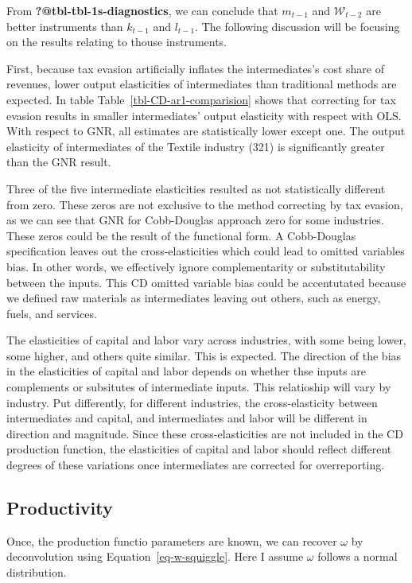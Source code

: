 \documentclass[
  12pt]{article}
\theoremstyle{definition}
\theoremstyle{remark}
\begin{document}
From \textbf{?@tbl-tbl-1s-diagnostics}, we can conclude that \(m_{t-1}\)
and \(\mathcal{W}_{t-2}\) are better instruments than \(k_{t-1}\) and
\(l_{t-1}\). The following discussion will be focusing on the results
relating to thouse instruments.

First, because tax evasion artificially inflates the intermediates's
cost share of revenues, lower output elasticities of intermediates than
traditional methods are expected. In table
Table~\ref{tbl-CD-ar1-comparision} shows that correcting for tax evasion
results in smaller intermediates' output elasticity with respect with
OLS. With respect to GNR, all estimates are statistically lower except
one. The output elasticity of intermediates of the Textile industry
(321) is significantly greater than the GNR result.

Three of the five intermediate elasticities resulted as not
statistically different from zero. These zeros are not exclusive to the
method correcting by tax evasion, as we can see that GNR for
Cobb-Douglas approach zero for some industries. These zeros could be the
result of the functional form. A Cobb-Douglas specification leaves out
the cross-elasticities which could lead to omitted variables bias. In
other words, we effectively ignore complementarity or substitutability
between the inputs. This CD omitted variable bias could be accentutated
because we defined raw materials as intermediates leaving out others,
such as energy, fuels, and services.

The elasticities of capital and labor vary across industries, with some
being lower, some higher, and others quite similar. This is expected.
The direction of the bias in the elasticities of capital and labor
depends on whether thse inputs are complements or subsitutes of
intermediate inputs. This relatioship will vary by industry. Put
differently, for different industries, the cross-elasticity between
intermediates and capital, and intermediates and labor will be different
in direction and magnitude. Since these cross-elasticities are not
included in the CD production function, the elasticities of capital and
labor should reflect different degrees of these variations once
intermediates are corrected for overreporting.

\subsection{Productivity}\label{productivity}

Once, the production functio parameters are known, we can recover
\(\omega\) by deconvolution using Equation~\ref{eq-w-squiggle}. Here I
assume \(\omega\) follows a normal distribution.
\end{document}
